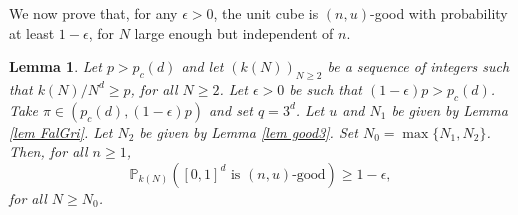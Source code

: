 \documentclass[11pt,a4paper]{article}
\newcommand{\pc}{\ensuremath{p_{c}(d)}}
\newcommand{\IP}{\ensuremath{\mathbb{P}}}
\newtheorem{lemma}[theorem]{Lemma}
\theoremstyle{remark}
\begin{document}
We now prove that, for any $\epsilon>0$, the unit cube is $(n,u)$-good with probability at least $1-\epsilon$, for $N$ large enough but independent of $n$.


\begin{lemma} \label{lem prob}
Let $p> \pc$ and let $(k(N))_{N \geq 2}$ be a sequence of integers such that $k(N)/N^{d} \geq  p$, for all $N \geq 2$. Let $\epsilon>0$ be such that $(1-\epsilon)p>\pc$. Take $\pi \in (\pc, (1-\epsilon)p)$ and set $q=3^d$. Let $u$ and $N_1$ be given by Lemma \ref{lem FalGri}. Let $N_2$ be given by Lemma \ref{lem good3}.  Set $N_0 =\max\{N_1,N_2\}$. Then, for all $n \geq 1$,
\begin{equation}\label{unit cube good}
 \IP_{k(N)}([0,1]^d \text{ is } (n,u)\text{-good}) \geq 1-\epsilon,
\end{equation}
for all $N \geq N_0$.
\end{lemma}
\end{document}
